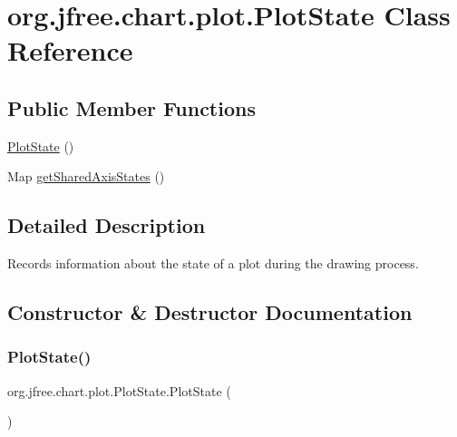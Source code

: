 \hypertarget{classorg_1_1jfree_1_1chart_1_1plot_1_1_plot_state}{}\section{org.\+jfree.\+chart.\+plot.\+Plot\+State Class Reference}
\label{classorg_1_1jfree_1_1chart_1_1plot_1_1_plot_state}
\subsection*{Public Member Functions}
\begin{DoxyCompactItemize}
\item 
\mbox{\hyperlink{classorg_1_1jfree_1_1chart_1_1plot_1_1_plot_state_af8cff70b04ccc6bb4547018a2de647c2}{Plot\+State}} ()
\item 
Map \mbox{\hyperlink{classorg_1_1jfree_1_1chart_1_1plot_1_1_plot_state_a06c76bb7bd009ee70b42124abd6eb8fe}{get\+Shared\+Axis\+States}} ()
\end{DoxyCompactItemize}


\subsection{Detailed Description}
Records information about the state of a plot during the drawing process. 

\subsection{Constructor \& Destructor Documentation}
\mbox{\label{classorg_1_1jfree_1_1chart_1_1plot_1_1_plot_state_af8cff70b04ccc6bb4547018a2de647c2}} 
\subsubsection{\texorpdfstring{Plot\+State()}{PlotState()}}
{\footnotesize\ttfamily org.\+jfree.\+chart.\+plot.\+Plot\+State.\+Plot\+State (\begin{DoxyParamCaption}{ }\end{DoxyParamCaption})}

